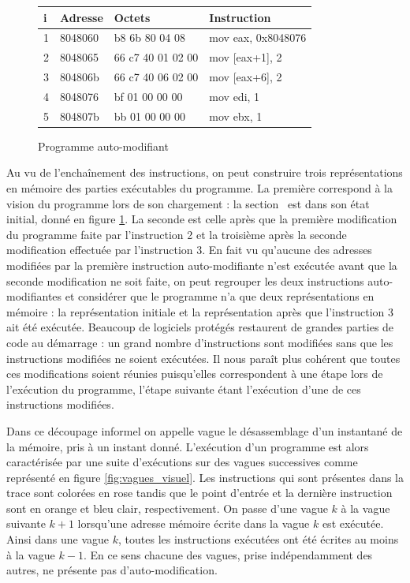 \begin{figure}[h]
\begin{center}
\begin{tabular}[b]{|l|l|l|l|}
\hline
i & Adresse & Octets & Instruction\\ 
\hline
1 & 8048060  &  b8 6b 80 04 08         &  mov    eax, 0x8048076\\
2 & 8048065  &  66 c7 40 01 02 00      &  mov    [eax+1], 2 \\
3 & 804806b  &  66 c7 40 06 02 00      &  mov    [eax+6], 2 \\
4 & 8048076  &  bf 01 00 00 00         &  mov    edi, 1 \\
5 & 804807b  &  bb 01 00 00 00         &  mov    ebx, 1 \\
\hline
\end{tabular}
\end{center}
\caption{Programme auto-modifiant}
\label{fig:prg_asm_sm}
\end{figure}

Au vu de l'enchaînement des instructions, on peut construire trois représentations en mémoire des parties exécutables du programme.
La première correspond à la vision du programme lors de son chargement : la section \ptext\ est dans son état initial, donné en figure \ref{fig:prg_asm_sm}.
La seconde est celle après que la première modification du programme faite par l'instruction 2 et la troisième après la seconde modification effectuée par l'instruction 3.
En fait vu qu'aucune des adresses modifiées par la première instruction auto-modifiante n'est exécutée avant que la seconde modification ne soit faite, on peut regrouper les deux instructions auto-modifiantes et considérer que le programme n'a que deux représentations en mémoire : la représentation initiale et la représentation après que l'instruction 3 ait été exécutée. 
Beaucoup de logiciels protégés restaurent de grandes parties de code au démarrage : un grand nombre d'instructions sont modifiées sans que les instructions modifiées ne soient exécutées. 
Il nous paraît plus cohérent que toutes ces modifications soient réunies puisqu'elles correspondent à une étape lors de l'exécution du programme, l'étape suivante étant l'exécution d'une de ces instructions modifiées.

Dans ce découpage informel on appelle vague le désassemblage d'un instantané de la mémoire, pris à un instant donné. 
L'exécution d'un programme est alors caractérisée par une suite d'exécutions sur des vagues successives comme représenté en figure \ref{fig:vagues_visuel}. Les instructions qui sont présentes dans la trace sont colorées en rose tandis que le point d'entrée et la dernière instruction sont en orange et bleu clair, respectivement.
On passe d'une vague $k$ à la vague suivante $k+1$ lorsqu'une adresse mémoire écrite dans la vague $k$ est exécutée.
Ainsi dans une vague $k$, toutes les instructions exécutées ont été écrites au moins à la vague $k-1$. 
En ce sens chacune des vagues, prise indépendamment des autres, ne présente pas d'auto-modification.

